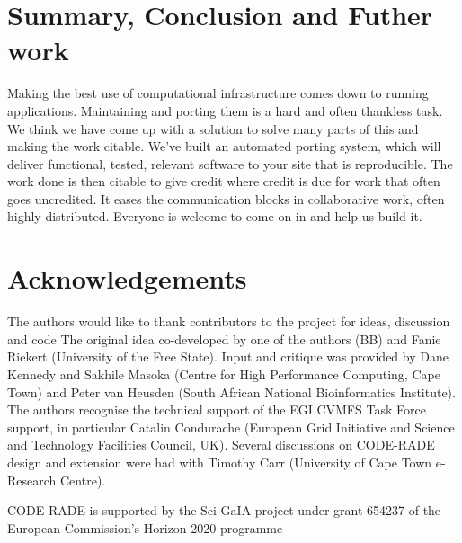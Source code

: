 \documentclass[a4paper]{jpconf}
\begin{document}
\section{Summary, Conclusion and Futher work}

Making the best use of computational infrastructure comes down to running applications.
Maintaining and porting them is a hard and often thankless task.
We think we have come up with a solution to solve many parts of this and making the work citable.
We've built an automated porting system, which will deliver functional, tested, relevant software to
your site that is reproducible. The work done is then citable to give credit where credit is due for work
that often goes uncredited.
It eases the communication blocks in collaborative work, often highly distributed.
Everyone is welcome to come on in and help us build it.

\section*{Acknowledgements}
The authors would like to thank contributors to the project for ideas, discussion and code
The original idea co-developed by one of the authors (BB) and Fanie Riekert (University of the Free
State). Input and critique was provided  by Dane Kennedy and Sakhile Masoka (Centre for High
Performance Computing, Cape Town) and Peter van Heusden (South African National Bioinformatics
Institute). The authors recognise the technical support of the EGI CVMFS Task Force support, in
particular Catalin Condurache (European Grid Initiative and Science and Technology Facilities
Council, UK). Several discussions on CODE-RADE design and extension were had with Timothy Carr
(University of Cape Town e-Research Centre).

CODE-RADE is supported by the Sci-GaIA project under grant 654237 of the European Commission's
Horizon 2020 programme
\end{document}
